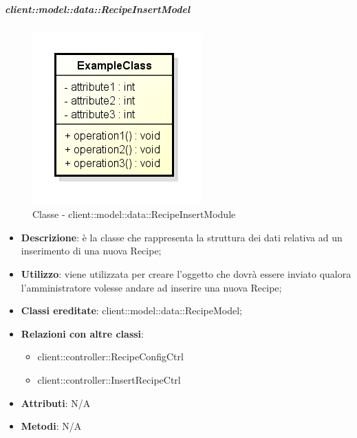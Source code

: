 		\subparagraph{client::model::data::RecipeInsertModel} %
		\label{subp:client_model_data_recipeinsertmodel}
			\begin{figure}[htbp]
				\centering
				\centerline{\includegraphics[scale=0.7]{./images/client/classes/example_class.png}}
				\caption{Classe - client::model::data::RecipeInsertModule}
			\end{figure}
			\begin{itemize}
				\item \textbf{Descrizione}: è la classe che rappresenta la struttura dei dati relativa ad un inserimento di una nuova Recipe;
				\item \textbf{Utilizzo}: viene utilizzata per creare l'oggetto che dovrà essere inviato qualora l'amministratore volesse andare ad inserire una nuova Recipe;
				\item \textbf{Classi ereditate}: client::model::data::RecipeModel;
				\item \textbf{Relazioni con altre classi}:
					\begin{itemize}
						\item client::controller::RecipeConfigCtrl
						\item client::controller::InsertRecipeCtrl
					\end{itemize}
				\item \textbf{Attributi}: N/A
				\item \textbf{Metodi}: N/A
			\end{itemize}

